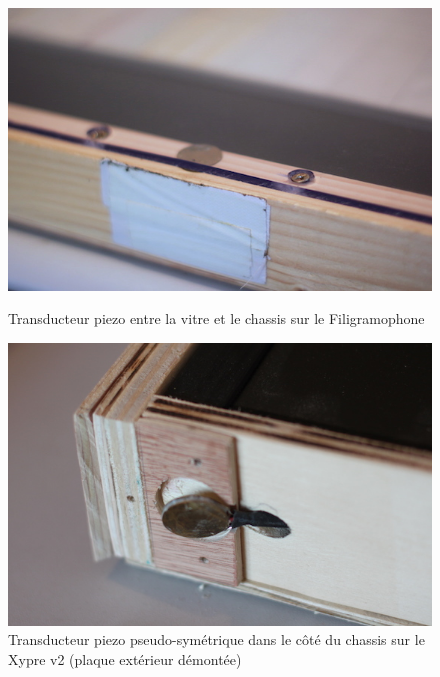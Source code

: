 \begin{figure}[!htbp]
	\captionsetup{format=plain}%
	\centering
	\begin{minipage}[t]{0.48\textwidth}
		\includegraphics[width=\linewidth]{gfx/05_interfaces/filigramophone-piezo_72dpi.jpg}
		\caption{Transducteur piezo entre la vitre et le chassis sur le Filigramophone}
		\label{fig:interface:filigramophone-piezo}
	\end{minipage}
	\hspace{.02\linewidth}
	\begin{minipage}[t]{0.48\textwidth}
	    \includegraphics[width=\linewidth]{gfx/05_interfaces/xypre-piezo_72dpi.jpg}
		\caption{Transducteur piezo pseudo-symétrique dans le côté du chassis sur le Xypre v2 (plaque extérieur démontée)}
		\label{fig:interface:xypre_v2-piezo}
	\end{minipage}
\end{figure}
